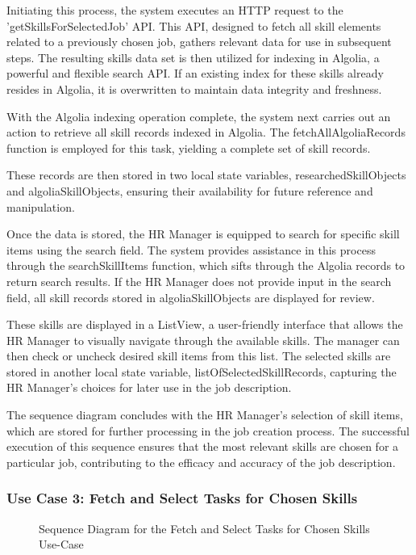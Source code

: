 Initiating this process, the system executes an HTTP request to the 'getSkillsForSelectedJob' API. This API, designed to fetch all skill elements related to a previously chosen job, gathers relevant data for use in subsequent steps. The resulting skills data set is then utilized for indexing in Algolia, a powerful and flexible search API. If an existing index for these skills already resides in Algolia, it is overwritten to maintain data integrity and freshness.

With the Algolia indexing operation complete, the system next carries out an action to retrieve all skill records indexed in Algolia. The fetchAllAlgoliaRecords function is employed for this task, yielding a complete set of skill records.

These records are then stored in two local state variables, researchedSkillObjects and algoliaSkillObjects, ensuring their availability for future reference and manipulation.

Once the data is stored, the HR Manager is equipped to search for specific skill items using the search field. The system provides assistance in this process through the searchSkillItems function, which sifts through the Algolia records to return search results. If the HR Manager does not provide input in the search field, all skill records stored in algoliaSkillObjects are displayed for review.

These skills are displayed in a ListView, a user-friendly interface that allows the HR Manager to visually navigate through the available skills. The manager can then check or uncheck desired skill items from this list. The selected skills are stored in another local state variable, listOfSelectedSkillRecords, capturing the HR Manager's choices for later use in the job description.

The sequence diagram concludes with the HR Manager's selection of skill items, which are stored for further processing in the job creation process. The successful execution of this sequence ensures that the most relevant skills are chosen for a particular job, contributing to the efficacy and accuracy of the job description.


\newpage
\subsubsection{Use Case 3: Fetch and Select Tasks for Chosen Skills} 

\begin{figure}[H]
    \centering
    \caption{ Sequence Diagram for the Fetch and Select Tasks for Chosen Skills Use-Case }
    \label{fig:UseCase3Sprint2_Sequence_Diagram}
\end{figure}

